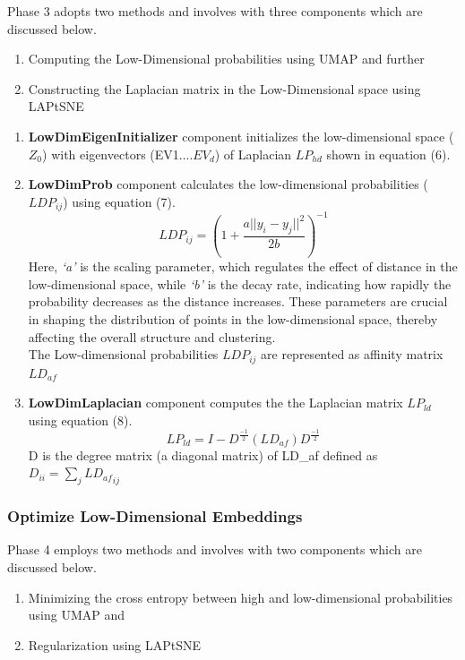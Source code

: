Phase 3 adopts two methods and involves with three components which are discussed below. 
\begin{enumerate}
    \item Computing the Low-Dimensional probabilities using UMAP \cite{umap_reference} and further \item Constructing the Laplacian matrix in the Low-Dimensional space using \hspace{1cm} LAPtSNE \cite{sun2023laplacian}
\end{enumerate}
\begin{enumerate}[label=\roman*]
    \item \textbf{LowDimEigenInitializer} component initializes the low-dimensional space ($Z_{0}$) with eigenvectors (EV1....$EV_{d}$) of Laplacian $LP_{hd}$ shown in equation (6).
    
    \item \textbf{LowDimProb} component calculates the low-dimensional probabilities ($LDP_{ij}$) using equation (7).
    \begin{equation}
     LDP_{ij} = \left(1 + \frac{a||y_i - y_j||^2}{2b} \right)^{-1} 
    \end{equation}
    Here, \textit{`a'} is the scaling parameter, which regulates the effect of distance in the low-dimensional space, while \textit{`b'} is the decay rate, indicating how rapidly the probability decreases as the distance increases. These parameters are crucial in shaping the distribution of points in the low-dimensional space, thereby affecting the overall structure and clustering.\\
    The Low-dimensional probabilities $LDP_{ij}$ are represented as affinity matrix $LD_{af}$
    
    \item \textbf{LowDimLaplacian} component computes the the Laplacian matrix $LP_{ld}$ using equation (8).
    \begin{equation}
    LP_{ld} = I - D^{\frac{-1}{2}} (LD_{af}) D^{\frac{-1}{2}} 
    \end{equation}
    D is the degree matrix (a diagonal matrix) of LD\_{af} defined as $D_{ii} = \sum_{j} {LD_{af}}_{ij}$
    
    
\end{enumerate}


\subsubsection{Optimize Low-Dimensional Embeddings}    
Phase 4 employs two methods and involves with two components which are discussed below. 
\begin{enumerate}
    \item Minimizing the cross entropy between high and low-dimensional probabilities using UMAP \cite{umap_reference} and 
    \item Regularization using LAPtSNE \cite{sun2023laplacian}
\end{enumerate}

